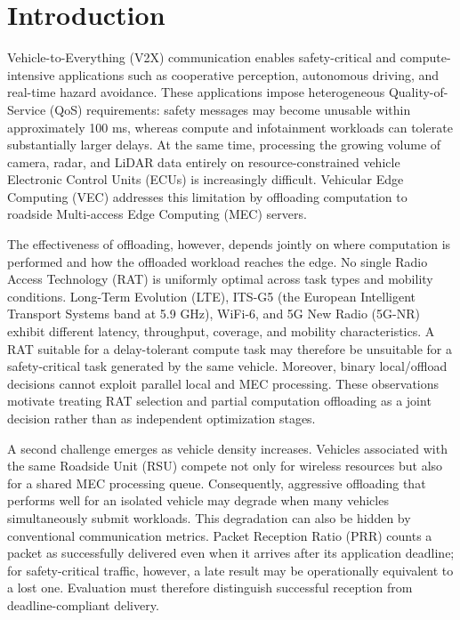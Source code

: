 \documentclass[journal,10pt,twocolumn]{IEEEtran}
\begin{document}
\section{Introduction}

Vehicle-to-Everything (V2X) communication enables safety-critical and compute-intensive applications such as cooperative perception, autonomous driving, and real-time hazard avoidance. These applications impose heterogeneous Quality-of-Service (QoS) requirements: safety messages may become unusable within approximately 100 ms, whereas compute and infotainment workloads can tolerate substantially larger delays. At the same time, processing the growing volume of camera, radar, and LiDAR data entirely on resource-constrained vehicle Electronic Control Units (ECUs) is increasingly difficult. Vehicular Edge Computing (VEC) addresses this limitation by offloading computation to roadside Multi-access Edge Computing (MEC) servers.

The effectiveness of offloading, however, depends jointly on where computation is performed and how the offloaded workload reaches the edge. No single Radio Access Technology (RAT) is uniformly optimal across task types and mobility conditions. Long-Term Evolution (LTE), ITS-G5 (the European Intelligent Transport Systems band at 5.9 GHz), WiFi-6, and 5G New Radio (5G-NR) exhibit different latency, throughput, coverage, and mobility characteristics. A RAT suitable for a delay-tolerant compute task may therefore be unsuitable for a safety-critical task generated by the same vehicle. Moreover, binary local/offload decisions cannot exploit parallel local and MEC processing. These observations motivate treating RAT selection and partial computation offloading as a joint decision rather than as independent optimization stages.

A second challenge emerges as vehicle density increases. Vehicles associated with the same Roadside Unit (RSU) compete not only for wireless resources but also for a shared MEC processing queue. Consequently, aggressive offloading that performs well for an isolated vehicle may degrade when many vehicles simultaneously submit workloads. This degradation can also be hidden by conventional communication metrics. Packet Reception Ratio (PRR) counts a packet as successfully delivered even when it arrives after its application deadline; for safety-critical traffic, however, a late result may be operationally equivalent to a lost one. Evaluation must therefore distinguish successful reception from deadline-compliant delivery.
\end{document}
